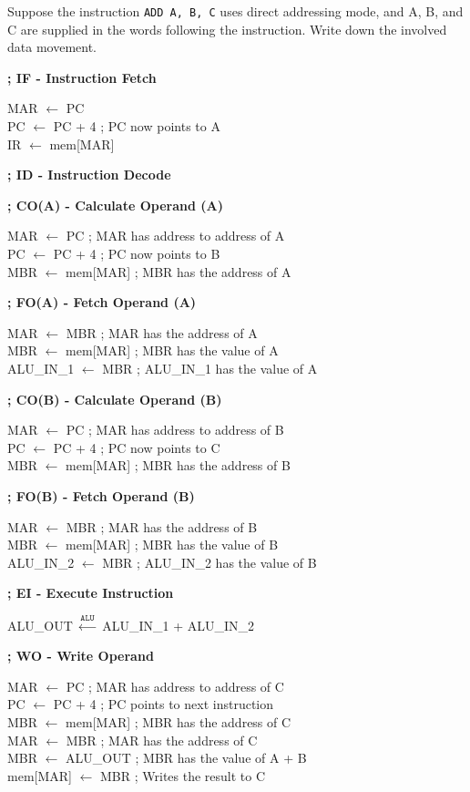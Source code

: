 \begin{example}
    Suppose the instruction \texttt{ADD A, B, C} uses direct addressing mode, and A, B, and C
    are supplied in the words following the instruction. Write down the involved data movement.

    \begin{multicols}{2}
        \ttfamily
        \textbf{; IF - Instruction Fetch} 

        MAR $\gets$ PC \\
        PC $\gets$ PC + 4 ; PC now points to A\\
        IR $\gets$ mem[MAR]

        \textbf{; ID - Instruction Decode}

        \textbf{; CO(A) - Calculate Operand (A)} 

        MAR $\gets$ PC ; MAR has address to address of A \\
        PC $\gets$ PC + 4 ; PC now points to B \\
        MBR $\gets$ mem[MAR] ; MBR has the address of A

        \textbf{; FO(A) - Fetch Operand (A)} 

        MAR $\gets$ MBR ; MAR has the address of A \\
        MBR $\gets$ mem[MAR] ; MBR has the value of A \\
        ALU\_IN\_1 $\gets$ MBR ; ALU\_IN\_1 has the value of A

        \textbf{; CO(B) - Calculate Operand (B)} 

        MAR $\gets$ PC ; MAR has address to address of B \\
        PC $\gets$ PC + 4 ; PC now points to C \\
        MBR $\gets$ mem[MAR] ; MBR has the address of B

        \textbf{; FO(B) - Fetch Operand (B)} 

        MAR $\gets$ MBR ; MAR has the address of B \\
        MBR $\gets$ mem[MAR] ; MBR has the value of B \\
        ALU\_IN\_2 $\gets$ MBR ; ALU\_IN\_2 has the value of B

        \textbf{; EI - Execute Instruction} 

        ALU\_OUT $\xleftarrow{\texttt{ALU}}$ ALU\_IN\_1 + ALU\_IN\_2

        \textbf{; WO - Write Operand} 

        MAR $\gets$ PC ; MAR has address to address of C \\
        PC $\gets$ PC + 4 ; PC points to next instruction \\
        MBR $\gets$ mem[MAR] ; MBR has the address of C \\
        MAR $\gets$ MBR ; MAR has the address of C \\
        MBR $\gets$ ALU\_OUT ; MBR has the value of A + B \\
        mem[MAR] $\gets$ MBR ; Writes the result to C
    \end{multicols}
\end{example}

